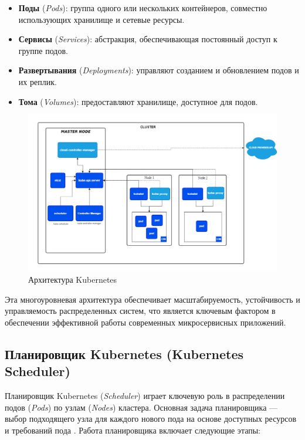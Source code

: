 \begin{itemize}
   \item \textbf{Поды} (\textit{Pods}): группа одного или нескольких
контейнеров, совместно использующих хранилище и сетевые ресурсы.
   \item \textbf{Сервисы} (\textit{Services}): абстракция, обеспечивающая
постоянный доступ к группе подов.
   \item \textbf{Развертывания} (\textit{Deployments}): управляют созданием и
обновлением подов и их реплик.
   \item \textbf{Тома} (\textit{Volumes}): предоставляют хранилище, доступное
для подов.
\end{itemize}

\begin{figure}[h]
   \centering
   \includegraphics[scale=0.4]{img/8.png}
   \caption{Архитектура Kubernetes}
   \label{fig:ccg}
 \end{figure}

Эта многоуровневая архитектура обеспечивает масштабируемость, устойчивость и
управляемость распределенных систем, что является ключевым фактором в
обеспечении эффективной работы современных микросервисных приложений.

\subsection*{Планировщик Kubernetes (Kubernetes Scheduler)}

Планировщик Kubernetes (\textit{Scheduler}) играет ключевую роль в распределении
подов (\textit{Pods}) по узлам (\textit{Nodes}) кластера. Основная задача
планировщика — выбор подходящего узла для каждого нового пода на основе доступных
ресурсов и требований пода \cite{luksa2017kubernetes}.
Работа планировщика включает следующие этапы:


